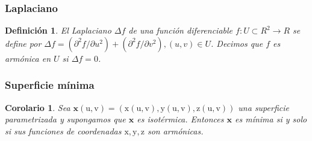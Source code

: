 \documentclass[10pt]{beamer}
\newtheorem{definicion}{Definición}
\newtheorem{corolario}{Corolario}[teorema]
\begin{document}
\begin{frame}
  \frametitle{Laplaciano}
  \begin{cajita}
    \begin{definicion}
      El Laplaciano \(\Delta f\) de una función diferenciable \(f: U \subset R^2 \rightarrow R\) se define por \(\Delta f=\left(\partial^2 f / \partial u^2\right)+\left(\partial^2 f / \partial v^2\right),(u, v) \in U\). Decimos que \(f\) es armónica en \(U\) si \(\Delta f=0\).
    \end{definicion}
  \end{cajita}

  \end{frame}

  \begin{frame}
    \frametitle{Superficie mínima}

    \begin{cajita}
      \begin{corolario}
        Sea \(\mathbf{x}(\mathrm{u}, \mathrm{v})=(\mathrm{x}(\mathrm{u}, \mathrm{v}), \mathrm{y}(\mathrm{u}, \mathrm{v}), \mathrm{z}(\mathrm{u}, \mathrm{v}))\) una superficie parametrizada y supongamos que \(\mathbf{x}\) es isotérmica. Entonces \(\mathbf{x}\) es mínima si y solo si sus funciones de coordenadas \(\mathrm{x}, \mathrm{y}, \mathrm{z}\) son armónicas.
      \end{corolario}
    \end{cajita}
    \end{frame}

    
  
\end{document}
